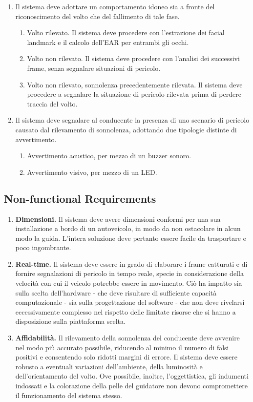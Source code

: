 \documentclass[12pt]{article}
\begin{document}
\begin{enumerate}
\begin{enumerate}
	\end{enumerate}
	\item Il sistema deve adottare un comportamento idoneo sia a fronte del riconoscimento del volto che del fallimento di tale fase.
	\begin{enumerate}
		\item Volto rilevato. Il sistema deve procedere con l'estrazione dei facial landmark e il calcolo dell'EAR per entrambi gli occhi.
		\item Volto non rilevato. Il sistema deve procedere con l'analisi dei successivi frame, senza segnalare situazioni di pericolo.
		\item Volto non rilevato, sonnolenza precedentemente rilevata. Il sistema deve procedere a segnalare la situazione di pericolo rilevata prima di perdere traccia del volto.
	\end{enumerate}
	\item Il sistema deve segnalare al conducente la presenza di uno scenario di pericolo causato dal rilevamento di sonnolenza, adottando due tipologie distinte di avvertimento.
	\begin{enumerate}
		\item Avvertimento acustico, per mezzo di un buzzer sonoro.
		\item Avvertimento visivo, per mezzo di un LED.
	\end{enumerate}
\end{enumerate}

\subsection{Non-functional Requirements}
\begin{enumerate}
	\item \textbf{Dimensioni.} Il sistema deve avere dimensioni conformi per una sua installazione a bordo di un autoveicolo, in modo da non ostacolare in alcun modo la guida. L'intera soluzione deve pertanto essere facile da trasportare e poco ingombrante.
	\item \textbf{Real-time.} Il sistema deve essere in grado di elaborare i frame catturati e di fornire segnalazioni di pericolo in tempo reale, specie in considerazione della velocità con cui il veicolo potrebbe essere in movimento. Ciò ha impatto sia sulla scelta dell'hardware - che deve risultare di sufficiente capacità computazionale - sia sulla progettazione del software - che non deve rivelarsi eccessivamente complesso nel rispetto delle limitate risorse che si hanno a disposizione sulla piattaforma scelta.
	\item \textbf{Affidabilità.} Il rilevamento della sonnolenza del conducente deve avvenire nel modo più accurato possibile, riducendo al minimo il numero di falsi positivi e consentendo solo ridotti margini di errore. Il sistema deve essere robusto a eventuali variazioni dell'ambiente, della luminosità e dell'orientamento del volto. Ove possibile, inoltre, l'oggettistica, gli indumenti indossati e la colorazione della pelle del guidatore non devono compromettere il funzionamento del sistema stesso.
\end{enumerate}
\end{document}
